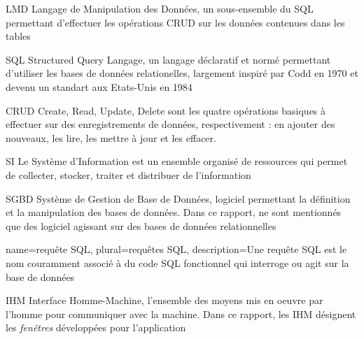         {LMD}
        {Langage de Manipulation des Données, un sous-ensemble du SQL permettant d'effectuer les opérations CRUD sur les données contenues dans les tables}

        {SQL}
        {Structured Query Langage, un langage déclaratif et normé permettant d'utiliser les bases de données relationelles, largement inspiré par Codd en 1970 et devenu un standart aux Etats-Unis en 1984}

                           {CRUD}
                           {Create, Read, Update, Delete sont les quatre opérations basiques à effectuer sur des enregistrements de données, respectivement : en ajouter des nouveaux, les lire, les mettre à jour et les effacer.}

                           {SI}
                           {Le Système d'Information est un ensemble organisé de ressources qui permet de collecter, stocker, traiter et distribuer de l'information}

                           {SGBD}
                           {Système de Gestion de Base de Données, logiciel permettant la définition et la manipulation des bases de données. Dans ce rapport, ne sont mentionnés que des logiciel agissant sur des bases de données relationnelles}

        {name={requête SQL},
        plural={requêtes SQL},
        description={Une requête SQL est le nom couramment associé à du code SQL fonctionnel qui interroge ou agit sur la base de données}}

	{IHM}
	{Interface Homme-Machine, l'ensemble des moyens mis en oeuvre par l'homme pour communiquer avec la machine.
	Dans ce rapport, les IHM désignent les \textit{fenêtres} développées pour l'application}


